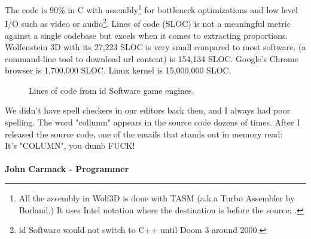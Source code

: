 \documentclass[book.tex]{subfiles}
\begin{document}
\par
 The code is 90\% in C with assembly\footnote{All the assembly in Wolf3D is done with TASM (a.k.a Turbo Assembler by Borland.) It uses Intel notation where the destination is before the source:   .} for bottleneck optimizations and low level I/O such as video or audio\footnote{id Software would not switch to C++ until Doom 3 around 2000.}. Lines of code (SLOC) is not a meaningful metric against a single codebase but excels when it comes to extracting proportions. Wolfenstein 3D with its 27,223 SLOC is very small compared to most software.  (a command-line tool to download url content) is 154,134 SLOC. Google's Chrome browser is 1,700,000 SLOC. Linux kernel is 15,000,000 SLOC.\\
\par
\begin{figure}[H]
\centering
   \caption{Lines of code from id Software game engines.}
 \end{figure}
 
\par

 \begin{fancyquotes}
   We didn't have spell checkers in our editors back then, and I always had poor spelling.  The word "collumn" appears in the source code dozens of times.  After I released the source code, one of the emails that stands out in memory read:
 \bigskip \\
It's "COLUMN", you dumb FUCK!\\
 \bigskip \\
\textbf{John Carmack - Programmer}
 \end{fancyquotes}
 
\end{document}
